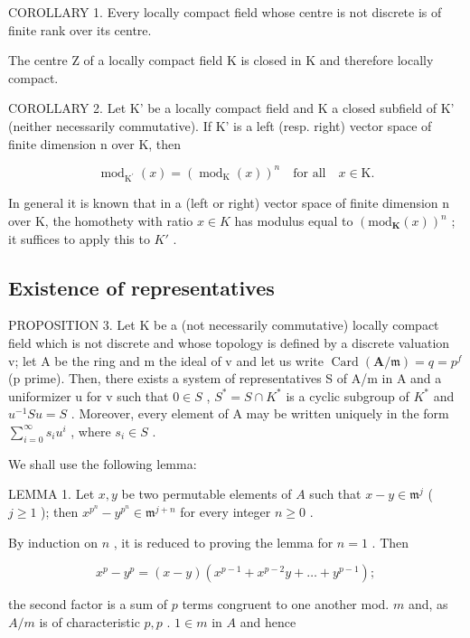 COROLLARY 1. Every locally compact field whose centre is not discrete is of finite rank over its centre.

The centre Z of a locally compact field K is closed in K and therefore locally compact.

COROLLARY 2. Let K' be a locally compact field and K a closed subfield of K' (neither necessarily commutative). If K' is a left (resp. right) vector space of finite dimension n over K, then

\[
\operatorname{mod} _ {\mathrm{K} ^ {\prime}} (x) = (\operatorname{mod} _ {\mathrm{K}} (x)) ^ {n} \quad \text {for all} \quad x \in \mathrm{K}.\tag{2}
\]

In general it is known that in a (left or right) vector space of finite dimension n over K, the homothety with ratio \(x \in K\) has modulus equal to \((\text{mod}_{\mathbf{K}}(x))^{n}\) ; it suffices to apply this to \(K'\) .

\subsection{Existence of representatives}

PROPOSITION 3. Let K be a (not necessarily commutative) locally compact field which is not discrete and whose topology is defined by a discrete valuation v; let A be the ring and m the ideal of v and let us write \(\operatorname{Card}(\mathbf{A}/\mathfrak{m}) = q = p^{f}\) (p prime). Then, there exists a system of representatives S of A/m in A and a uniformizer u for v such that \(0 \in S\) , \(S^{*} = S \cap K^{*}\) is a cyclic subgroup of \(K^{*}\) and \(u^{-1} Su = S\) . Moreover, every element of A may be written uniquely in the form \(\sum_{i=0}^{\infty} s_{i} u^{i}\) , where \(s_{i} \in S\) .

We shall use the following lemma:

LEMMA 1. Let \(x, y\) be two permutable elements of \(A\) such that \(x - y \in \mathfrak{m}^j\) ( \(j \geqslant 1\) ); then \(x^{p^n} - y^{p^n} \in \mathfrak{m}^{j + n}\) for every integer \(n \geqslant 0\) .

By induction on \(n\) , it is reduced to proving the lemma for \(n = 1\) . Then

\[
x ^ {p} - y ^ {p} = (x - y) \left(x ^ {p - 1} + x ^ {p - 2} y + \dots + y ^ {p - 1}\right);
\]

the second factor is a sum of \(p\) terms congruent to one another mod. \(m\) and, as \(A / m\) is of characteristic \(p, p\) . \(1 \in m\) in \(A\) and hence

